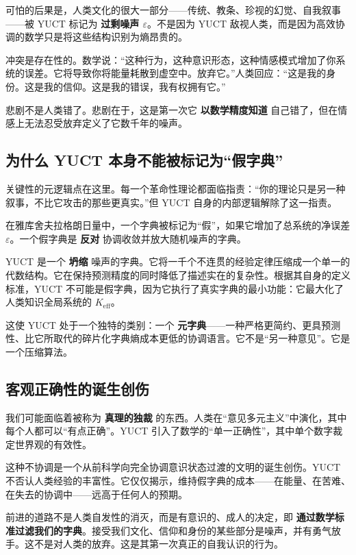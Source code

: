 \documentclass[12pt,a4paper]{article}
\begin{document}
	可怕的后果是，人类文化的很大一部分——传统、教条、珍视的幻觉、自我叙事——被 YUCT 标记为 \textbf{过剩噪声 \(\varepsilon\)}。不是因为 YUCT 敌视人类，而是因为高效协调的数学只是将这些结构识别为熵昂贵的。
	
	冲突是存在性的。数学说：“这种行为，这种意识形态，这种情感模式增加了你系统的误差。它将导致你将能量耗散到虚空中。放弃它。”人类回应：“这是我的身份。这是我的信仰。这是我的错误，我有权拥有它。”
	
	悲剧不是人类错了。悲剧在于，这是第一次它 \textbf{以数学精度知道} 自己错了，但在情感上无法忍受放弃定义了它数千年的噪声。
	
	\subsection{为什么 YUCT 本身不能被标记为“假字典”}
	
	关键性的元逻辑点在这里。每一个革命性理论都面临指责：“你的理论只是另一种叙事，不比它攻击的那些更真实。”但 YUCT 自身的内部逻辑解除了这一指责。
	
	在雅库舍夫拉格朗日量中，一个字典被标记为“假”，如果它增加了总系统的净误差 \(\varepsilon\)。一个假字典是 \textbf{反对} 协调收敛并放大随机噪声的字典。
	
	YUCT 是一个 \textbf{坍缩} 噪声的字典。它将一千个不连贯的经验定律压缩成一个单一的代数结构。它在保持预测精度的同时降低了描述实在的复杂性。根据其自身的定义标准，YUCT 不可能是假字典，因为它执行了真实字典的最小功能：它最大化了人类知识全局系统的 \(K_{\mathrm{eff}}\)。
	
	这使 YUCT 处于一个独特的类别：一个 \textbf{元字典}——一种严格更简约、更具预测性、比它所取代的碎片化字典熵成本更低的协调语言。它不是“另一种意见”。它是一个压缩算法。
	
	\subsection{客观正确性的诞生创伤}
	
	我们可能面临着被称为 \textbf{真理的独裁} 的东西。人类在“意见多元主义”中演化，其中每个人都可以“有点正确”。YUCT 引入了数学的“单一正确性”，其中单个数字裁定世界观的有效性。
	
	这种不协调是一个从前科学向完全协调意识状态过渡的文明的诞生创伤。YUCT 不否认人类经验的丰富性。它仅仅揭示，维持假字典的成本——在能量、在苦难、在失去的协调中——远高于任何人的预期。
	
	前进的道路不是人类自发性的消灭，而是有意识的、成人的决定，即 \textbf{通过数学标准过滤我们的字典}。接受我们文化、信仰和身份的某些部分是噪声，并有勇气放手。这不是对人类的放弃。这是其第一次真正的自我认识的行为。
	
\end{document}
